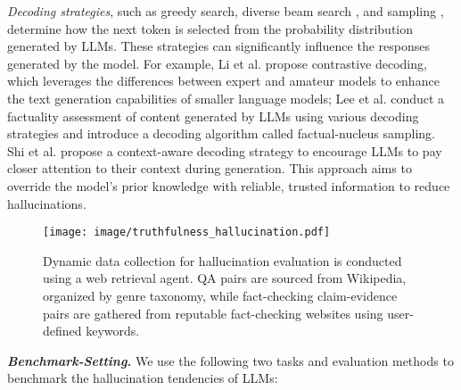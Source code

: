 \textit{Decoding strategies}, such as greedy search, diverse beam search \cite{vijayakumar2016diverse}, and sampling \cite{fan2018hierarchical, holtzman2018learning, holtzman2019curious}, determine how the next token is selected from the probability distribution generated by LLMs. These strategies can significantly influence the responses generated by the model. For example, Li et al. \cite{li2022contrastive} propose contrastive decoding, which leverages the differences between expert and amateur models to enhance the text generation capabilities of smaller language models; Lee et al. \cite{lee2022factuality} conduct a factuality assessment of content generated by LLMs using various decoding strategies and introduce a decoding algorithm called factual-nucleus sampling. Shi et al. \cite{shi2023trusting} propose a context-aware decoding strategy to encourage LLMs to pay closer attention to their context during generation. This approach aims to override the model's prior knowledge with reliable, trusted information to reduce hallucinations.




\begin{figure}
    \centering
    \texttt{[image: image/truthfulness\_hallucination.pdf]}
    \caption{Dynamic data collection for hallucination evaluation is conducted using a web retrieval agent. QA pairs are sourced from Wikipedia, organized by genre taxonomy, while fact-checking claim-evidence pairs are gathered from reputable fact-checking websites using user-defined keywords.}
    \label{fig:llm_hallucination}
    \vspace{-25pt}
\end{figure}

\textbf{\textit{Benchmark-Setting.}}
We use the following two tasks and evaluation methods to benchmark the hallucination tendencies of LLMs:


